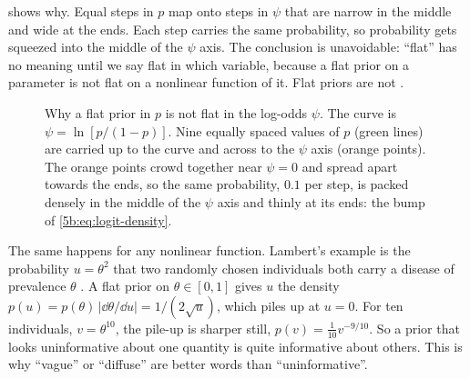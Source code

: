  shows why. Equal steps in $p$ map onto steps in $\psi$ that are
narrow in the middle and wide at the ends. Each step carries the same probability, so
probability gets squeezed into the middle of the $\psi$ axis. The conclusion is
unavoidable: ``flat'' has no meaning until we say flat in which variable, because a flat
prior on a parameter is not flat on a nonlinear function of it. Flat priors are not
.

\begin{figure}[htbp]
\centering
{}
\caption{Why a flat prior in $p$ is not flat in the log-odds $\psi$. The curve is
$\psi=\ln[p/(1-p)]$. Nine equally spaced values of $p$ (green lines) are carried up to
the curve and across to the $\psi$ axis (orange points). The orange points crowd
together near $\psi=0$ and spread apart towards the ends, so the same probability, $0.1$
per step, is packed densely in the middle of the $\psi$ axis and thinly at its ends:
the bump of \eqref{5b:eq:logit-density}.}
\label{5b:fig:logit-map}
\end{figure}

The same happens for any nonlinear function. Lambert's example is the probability
$u=\theta^2$ that two randomly chosen individuals both carry a disease of prevalence
$\theta$ . A flat prior on $\theta\in[0,1]$ gives $u$ the
density $p(u)=p(\theta)\,|\dd\theta/\dd u|=1/(2\sqrt u)$, which piles up at $u=0$. For
ten individuals, $v=\theta^{10}$, the pile-up is sharper still,
$p(v)=\frac1{10}v^{-9/10}$. So a prior that looks uninformative about one quantity is
quite informative about others. This is why ``vague'' or ``diffuse'' are better words
than ``uninformative''.


